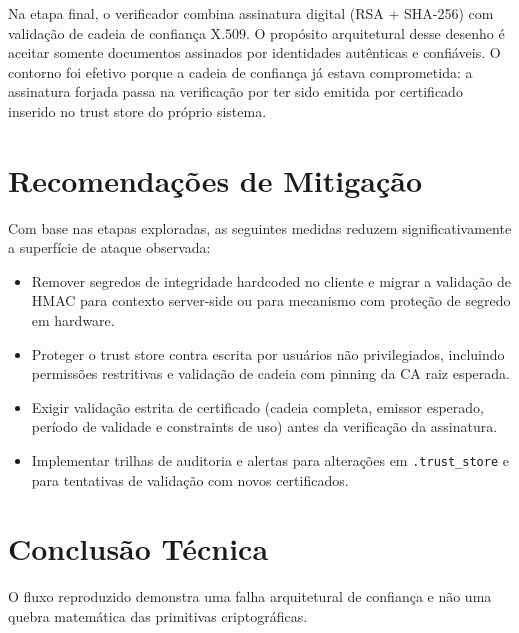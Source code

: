 \documentclass[12pt,a4paper]{article}
\begin{document}
Na etapa final, o verificador combina assinatura digital (RSA + SHA-256) com validação de cadeia de confiança X.509.
O propósito arquitetural desse desenho é aceitar somente documentos assinados por identidades autênticas e confiáveis.
O contorno foi efetivo porque a cadeia de confiança já estava comprometida: a assinatura forjada passa na verificação por ter sido emitida por certificado inserido no trust store do próprio sistema.


\section{Recomendações de Mitigação}

Com base nas etapas exploradas, as seguintes medidas reduzem significativamente a superfície de ataque observada:

\begin{itemize}
    \item Remover segredos de integridade hardcoded no cliente e migrar a validação de HMAC para contexto server-side ou para mecanismo com proteção de segredo em hardware.
    \item Proteger o trust store contra escrita por usuários não privilegiados, incluindo permissões restritivas e validação de cadeia com pinning da CA raiz esperada.
    \item Exigir validação estrita de certificado (cadeia completa, emissor esperado, período de validade e constraints de uso) antes da verificação da assinatura.
    \item Implementar trilhas de auditoria e alertas para alterações em \texttt{.trust\_store} e para tentativas de validação com novos certificados.
\end{itemize}


\section{Conclusão Técnica}

O fluxo reproduzido demonstra uma falha arquitetural de confiança e não uma quebra matemática das primitivas criptográficas.
\end{document}
